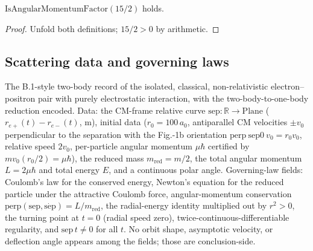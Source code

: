 \begin{lemma}
\label{lem:IPhO2026Problems_problem_IPhO_2026_1_B_2:unboundMu_isAngularMomentumFactor}
$\mathrm{IsAngularMomentumFactor}(15/2)$ holds.
\end{lemma}
\begin{proof}
Unfold both definitions; $15/2 > 0$ by arithmetic.
\end{proof}

\subsection*{Scattering data and governing laws}

\begin{definition}
\label{def:IPhO2026Problems_problem_IPhO_2026_1_B_2:CoulombScatteringData}
The B.1-style two-body record of the isolated, classical, non-relativistic
electron--positron pair with purely electrostatic interaction, with the
two-body-to-one-body reduction encoded.  Data: the CM-frame relative
curve $\mathrm{sep} : \mathbb{R} \to \mathrm{Plane}$
($r_{e+}(t) - r_{e-}(t)$, m), initial data ($r_0 = 100\,a_0$, antiparallel
CM velocities $\pm v_0$ perpendicular to the separation with the Fig.-1b
orientation $\mathrm{perp}\ \mathrm{sep0}\ v_0 = r_0 v_0$, relative speed
$2v_0$, per-particle angular momentum $\mu\hbar$ certified by
$m v_0 (r_0/2) = \mu \hbar$), the reduced mass $m_{\mathrm{red}} = m/2$,
the total angular momentum $L = 2\mu\hbar$ and total energy $E$, and a
continuous polar angle.  Governing-law fields: Coulomb's law for the
conserved energy, Newton's equation for the reduced particle under the
attractive Coulomb force, angular-momentum conservation
$\mathrm{perp}(\mathrm{sep}, \dot{\mathrm{sep}}) = L/m_{\mathrm{red}}$, the
radial-energy identity multiplied out by $r^2 > 0$, the turning point at
$t = 0$ (radial speed zero), twice-continuous-differentiable regularity,
and $\mathrm{sep}\,t \neq 0$ for all $t$.  No orbit shape, asymptotic
velocity, or deflection angle appears among the fields; those are
conclusion-side.
\end{definition}

